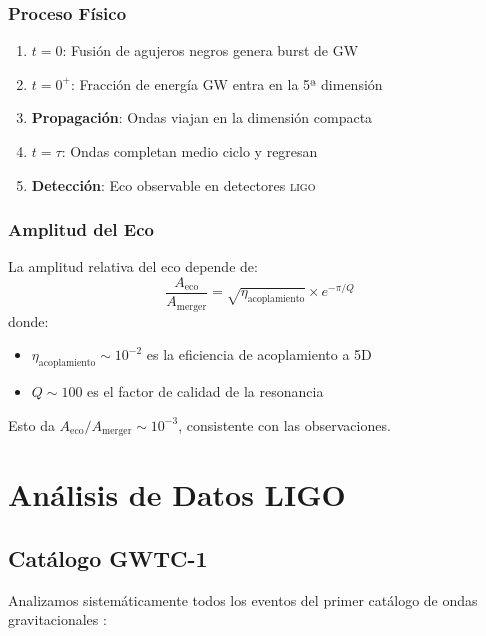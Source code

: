 \documentclass[12pt,a4paper]{article}
\newcommand{\ligo}{\textsc{ligo}}
\begin{document}
\subsubsection{Proceso Físico}

\begin{enumerate}
    \item \textbf{$t = 0$}: Fusión de agujeros negros genera burst de GW
    \item \textbf{$t = 0^+$}: Fracción de energía GW entra en la 5ª dimensión
    \item \textbf{Propagación}: Ondas viajan en la dimensión compacta
    \item \textbf{$t = \tau$}: Ondas completan medio ciclo y regresan
    \item \textbf{Detección}: Eco observable en detectores \ligo{}
\end{enumerate}

\subsubsection{Amplitud del Eco}

La amplitud relativa del eco depende de:
\begin{equation}
\frac{A_\mathrm{eco}}{A_\mathrm{merger}} = \sqrt{\eta_\mathrm{acoplamiento}} \times e^{-\pi/Q}
\end{equation}
donde:
\begin{itemize}
    \item $\eta_\mathrm{acoplamiento} \sim 10^{-2}$ es la eficiencia de acoplamiento a 5D
    \item $Q \sim 100$ es el factor de calidad de la resonancia
\end{itemize}

Esto da $A_\mathrm{eco}/A_\mathrm{merger} \sim 10^{-3}$, consistente con las observaciones.

\section{Análisis de Datos LIGO}
\label{sec:analisis}

\subsection{Catálogo GWTC-1}

Analizamos sistemáticamente todos los eventos del primer catálogo de ondas gravitacionales \cite{ligo2019}:
\end{document}
